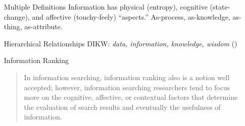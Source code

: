 \documentclass{article}
\begin{document}
\begin{itemize}
    {\bf People -- Information Searching}
    \begin{itemize}
        \item {}
        \item {}
    \end{itemize}

    {\bf People -- Both}
    \begin{itemize}
        \item {}
        \item {}
    \end{itemize}

    {\bf People -- Information Retrieval}
    \begin{itemize}
        \item {} (assumed that providing information helps a user accomplish some task)
    \end{itemize}

    {\bf Technology -- Information Searching}
    \begin{itemize}
        \item {}
    \end{itemize}

    {\bf Technology -- Both}
    \begin{itemize}
        \item {}
    \end{itemize}

    {\bf Technology -- Information Retrieval}
    \begin{itemize}
        \item {} (transformed input)
        \item {}
        \item {}
    \end{itemize}

    \item[Multiple Definitions] Information has physical (entropy), cognitive (state-change), and affective (touchy-feely) ``aspects.''  As-process, as-knowledge, as-thing, as-attribute.

    \item[Hierarchical Relationships] DIKW: {\it data, information, knowledge, wisdom} ()

    \item[Information Ranking]
        \begin{quote}
            In information searching, information ranking also is a notion well accepted; however, information searching researchers tend to focus more on the cognitive, affective, or contextual factors that determine the evaluation of search results and eventually the usefulness of information.
        \end{quote}


\end{itemize}
\end{document}

